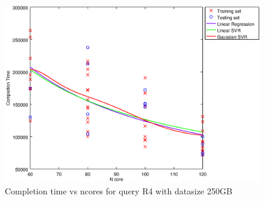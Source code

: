 
\begin {figure}[hbtp]
\centering
\includegraphics[width=\textwidth]{output/R4_250_ONLY_1_OVER_NCORES/plot_R4_250_bestmodels.eps}
\caption{Completion time vs ncores for query R4 with datasize 250GB}
\label{fig:all_nonlinear_R4_250}
\end {figure}
